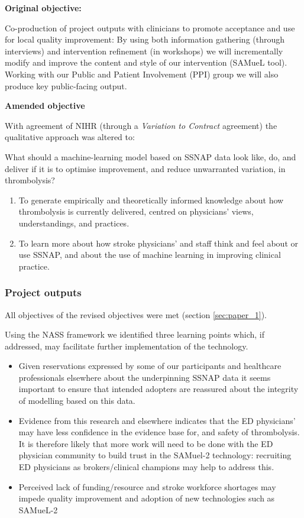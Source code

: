 \textbf{Original objective:}

Co-production of project outputs with clinicians to promote acceptance and use for local quality improvement: By using both information gathering (through interviews) and intervention refinement (in workshops) we will incrementally modify and improve the content and style of our intervention (SAMueL tool). Working with our Public and Patient Involvement (PPI) group we will also produce key public-facing output.

\textbf{Amended objective}

With agreement of NIHR (through a \textit{Variation to Contract} agreement) the qualitative approach was altered to:

What should a machine-learning model based on SSNAP data look like, do, and deliver if it is to optimise improvement, and reduce unwarranted variation, in thrombolysis?

\begin{enumerate}
    \item To generate empirically and theoretically informed knowledge about how thrombolysis is currently delivered, centred on physicians’ views, understandings, and practices.
    \item To learn more about how stroke physicians’ and staff think and feel about or use SSNAP, and about the use of machine learning in improving clinical practice.
\end{enumerate}


\subsubsection{Project outputs}

All objectives of the revised objectives were met (section \ref{sec:paper_1}).

Using the NASS framework we identified three learning points which, if addressed, may facilitate further implementation of the technology. 

\begin{itemize}
    \item Given reservations expressed by some of our participants and healthcare professionals elsewhere about the underpinning SSNAP data it seems important to ensure that intended adopters are reassured about the integrity of modelling based on this data.
    \item Evidence from this research and elsewhere indicates that the ED physicians’ may have less confidence in the evidence base for, and safety of thrombolysis. It is therefore likely that more work will need to be done with the ED physician community to build trust in the SAMuel-2 technology: recruiting ED physicians as brokers/clinical champions may help to address this.
    \item Perceived lack of funding/resource and stroke workforce shortages may impede quality improvement and adoption of new technologies such as SAMueL-2
\end{itemize}